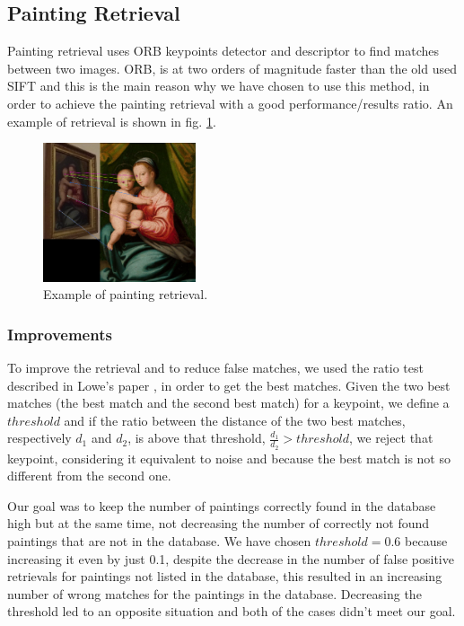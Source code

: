 \subsection{Painting Retrieval}
Painting retrieval uses ORB \cite{orb} keypoints detector and descriptor to find matches between two images. ORB, is at two orders of magnitude faster than the old used SIFT \cite{sift} and this is the main reason why we have chosen to use this method, in order to achieve the painting retrieval with a good performance/results ratio.
An example of retrieval is shown in fig. \ref{fig:retrieval_ex}.
\begin{figure}[h!]
    \centering
    \includegraphics[width=0.4\textwidth]{pictures/painting_retrieval/retrieval}
    \caption{Example of painting retrieval.}
    \label{fig:retrieval_ex}
\end{figure}

\subsubsection{Improvements}
To improve the retrieval and to reduce false matches, we used the ratio test described in Lowe's paper \cite{sift}, in order to get the best matches. Given the two best matches (the best match and the second best match) for a keypoint, we define a \(threshold\) and if the ratio between the distance of the two best matches, respectively \(d_1\) and \(d_2\), is above that threshold, \(\frac{d_1}{d_2}>threshold\), we reject that keypoint, considering it equivalent to noise and because the best match is not so different from the second one.

Our goal was to keep the number of paintings correctly found in the database high but at the same time, not decreasing the number of correctly not found paintings that are not in the database. We have chosen \(threshold = 0.6\) because increasing it even by just 0.1, despite the decrease in the number of false positive retrievals for paintings not listed in the database, this resulted in an increasing number of wrong matches for the paintings in the database. Decreasing the threshold led to an opposite situation and both of the cases didn't meet our goal.

